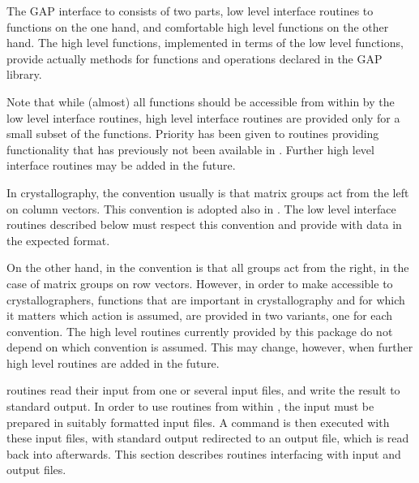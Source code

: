 
The {GAP} interface to {\CARAT} consists of two parts, low level 
interface routines to {\CARAT} functions on the one hand, and 
comfortable high level {\GAP} functions on the other hand. 
The high level functions, implemented in terms of the low level 
functions, provide actually methods for functions and operations 
declared in the {GAP} library.

Note that while (almost) all {\CARAT} functions should be accessible
from within {\GAP} by the low level interface routines, high level
interface routines are provided only for a small subset of the
{\CARAT} functions. Priority has been given to routines providing
functionality that has previously not been available in {\GAP}.
Further high level interface routines may be added in the future.


In crystallography, the convention usually is that matrix groups
act from the left on column vectors. This convention is adopted
also in {\CARAT}. The low level interface routines described below
must respect this convention and provide {\CARAT} with data in the 
expected format.

On the other hand, in {\GAP} the convention is that all groups 
act from the right, in the case of matrix groups on row vectors. 
However, in order to make {\GAP} accessible to crystallographers,
functions that are important in crystallography and for which it
matters which action is assumed, are provided in two variants, 
one for each convention. The high level routines currently provided
by this package do not depend on which convention is assumed.
This may change, however, when further high level routines are 
added in the future.


{\CARAT} routines read their input from one or several input files,
and write the result to standard output. In order to use {\CARAT}
routines from within {\GAP}, the input must be prepared in suitably
formatted input files. A {\CARAT} command is then executed with these
input files, with standard output redirected to an output file, 
which is read back into {\GAP} afterwards. This section describes
routines interfacing with {\CARAT} input and output files.

